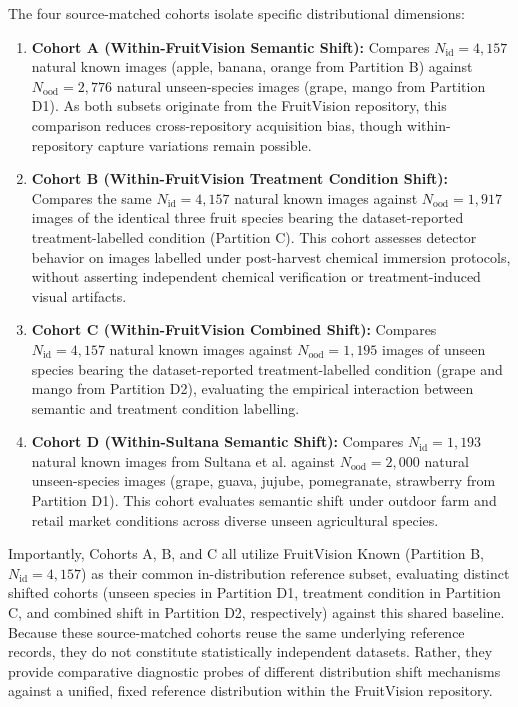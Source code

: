 The four source-matched cohorts isolate specific distributional dimensions:
\begin{enumerate}
\item \textbf{Cohort A (Within-FruitVision Semantic Shift):} Compares $N_{\text{id}} = 4,157$ natural known images (apple, banana, orange from Partition B) against $N_{\text{ood}} = 2,776$ natural unseen-species images (grape, mango from Partition D1). As both subsets originate from the FruitVision repository, this comparison reduces cross-repository acquisition bias, though within-repository capture variations remain possible.
\item \textbf{Cohort B (Within-FruitVision Treatment Condition Shift):} Compares the same $N_{\text{id}} = 4,157$ natural known images against $N_{\text{ood}} = 1,917$ images of the identical three fruit species bearing the dataset-reported treatment-labelled condition (Partition C). This cohort assesses detector behavior on images labelled under post-harvest chemical immersion protocols, without asserting independent chemical verification or treatment-induced visual artifacts.
\item \textbf{Cohort C (Within-FruitVision Combined Shift):} Compares $N_{\text{id}} = 4,157$ natural known images against $N_{\text{ood}} = 1,195$ images of unseen species bearing the dataset-reported treatment-labelled condition (grape and mango from Partition D2), evaluating the empirical interaction between semantic and treatment condition labelling.
\item \textbf{Cohort D (Within-Sultana Semantic Shift):} Compares $N_{\text{id}} = 1,193$ natural known images from Sultana et al. against $N_{\text{ood}} = 2,000$ natural unseen-species images (grape, guava, jujube, pomegranate, strawberry from Partition D1). This cohort evaluates semantic shift under outdoor farm and retail market conditions across diverse unseen agricultural species.
\end{enumerate}

Importantly, Cohorts A, B, and C all utilize FruitVision Known (Partition B, $N_{\text{id}} = 4,157$) as their common in-distribution reference subset, evaluating distinct shifted cohorts (unseen species in Partition D1, treatment condition in Partition C, and combined shift in Partition D2, respectively) against this shared baseline. Because these source-matched cohorts reuse the same underlying reference records, they do not constitute statistically independent datasets. Rather, they provide comparative diagnostic probes of different distribution shift mechanisms against a unified, fixed reference distribution within the FruitVision repository.

